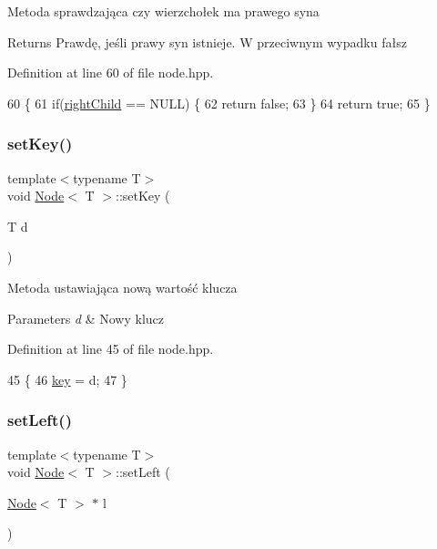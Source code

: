 Metoda sprawdzająca czy wierzchołek ma prawego syna \begin{DoxyReturn}{Returns}
Prawdę, jeśli prawy syn istnieje. W przeciwnym wypadku fałsz 
\end{DoxyReturn}


Definition at line 60 of file node.\+hpp.


\begin{DoxyCode}
60                        \{
61             \textcolor{keywordflow}{if}(\hyperlink{classNode_a625cff56d169157a568afaedbb11576b}{rightChild} == NULL) \{
62                 \textcolor{keywordflow}{return} \textcolor{keyword}{false};
63             \}
64             \textcolor{keywordflow}{return} \textcolor{keyword}{true};
65         \}
\end{DoxyCode}
\mbox{\label{classNode_a3162a541ae436cd98d61750f07f274b2}} 
\subsubsection{\texorpdfstring{set\+Key()}{setKey()}}
{\footnotesize\ttfamily template$<$typename T$>$ \\
void \hyperlink{classNode}{Node}$<$ T $>$\+::set\+Key (\begin{DoxyParamCaption}\item[{T}]{d }\end{DoxyParamCaption})\hspace{0.3cm}{\ttfamily [inline]}}

Metoda ustawiająca nową wartość klucza 
\begin{DoxyParams}{Parameters}
{\em d} & Nowy klucz \\
\hline
\end{DoxyParams}


Definition at line 45 of file node.\+hpp.


\begin{DoxyCode}
45                          \{
46             \hyperlink{classNode_a9d5e5c1914f5ed67389740354a607527}{key} = d;
47         \}
\end{DoxyCode}
\mbox{\label{classNode_afc70e20117ea8083d11736f5ea8a9216}} 
\subsubsection{\texorpdfstring{set\+Left()}{setLeft()}}
{\footnotesize\ttfamily template$<$typename T$>$ \\
void \hyperlink{classNode}{Node}$<$ T $>$\+::set\+Left (\begin{DoxyParamCaption}\item[{\hyperlink{classNode}{Node}$<$ T $>$ $\ast$}]{l }\end{DoxyParamCaption})\hspace{0.3cm}{\ttfamily [inline]}}

